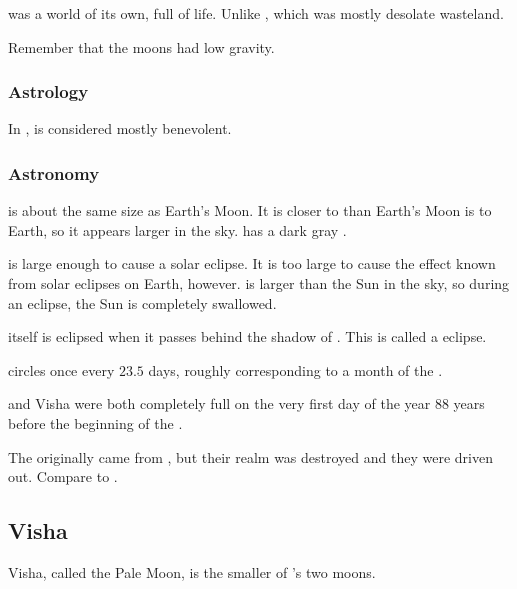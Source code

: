 \Dun{} was a world of its own, full of life. 
Unlike , which was mostly desolate wasteland. 

Remember that the moons had low gravity. 





\subsubsection{Astrology}
In , \Dun{} is considered mostly benevolent. 





\subsubsection{Astronomy}
\Dun{} is about the same size as Earth's Moon. It is closer to \Miith{} than Earth's Moon is to Earth, so it appears larger in the sky. \Dun{} has a dark gray \colour. 

\Dun{} is large enough to cause a solar eclipse. It is too large to cause the  effect known from solar eclipses on Earth, however. \Dun{} is larger than the Sun in the sky, so during an eclipse, the Sun is completely swallowed. 

\Dun{} itself is eclipsed when it passes behind the shadow of \Miith{}. This is called a \Dun{} eclipse. 

\Dun{} circles \Miith{} once every $23.5$ days, roughly corresponding to a month of the . 

\Dun and Visha were both completely full on the very first day of the year 88 years before the beginning of the . 

The  originally came from \Dun, but their realm was destroyed and they were driven out. 
Compare to \cite{HPLovecraft:TheDoomThatCametoSarnath}.  









\subsection{Visha}
Visha, called the Pale Moon, is the smaller of \Miith{}'s two moons. 

